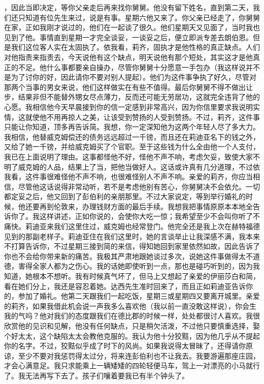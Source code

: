 {，因此当即决定，等你父亲走后再来找你舅舅。他没有留下姓名，直到第二天，我们还只知道有位先生来过，说是有事。星期六他又来了。你父亲已经走了，你舅舅在家，正如我刚才说过的，他们在一起谈了很久。他们星期天又见面了，当时我也见到了他。事情直到星期一才完全谈妥，一谈妥之后，便立即派专差去朗伯恩。但是我们这位客人实在太固执了。依我看，莉齐，固执才是他性格的真正缺点。人们对他指责来指责去，今天说他有这个缺点，明天说他有那个短处，其实这才是他真正的不足。他什么事都要亲自操办，尽管你舅舅十分愿意一手包办（我这样说并不是为了讨你的好，因此请你不要对别人提起）。他们为这件事争执了好久，尽管对那两个当事的男女来说，他们这样做实在有些不值得。最后你舅舅不得不做出让步，结果非但不能替外甥女尽点薄力，反而还可能无劳居功，这就完全违背了他的心愿。我相信他今天早晨接到你的信一定感到非常高兴，因为你信里要求我说明实情，这就使他不用再掠人之美，让该受到赞扬的人受到赞扬。不过，莉齐，这件事只能让你知道，顶多再告诉简。我想，你一定深知他为这两个年轻人尽了多大力。我相信，他替威克姆偿还的债务远远超过一千镑，而且还在莉迪亚名下的钱之外，又给了她一千镑，并给威克姆买了个官职。至于这些钱为什么全由他一个人支付，我已在上面说明了理由。这事都怪他不好，怪他不声不响，考虑欠妥，致使大家不明了威克姆的人品，结果上了当，把他当做好人。这话或许真有几分道理，不过依我看，这件事很难怪他不声不响，也很难怪别人不声不响。亲爱的莉齐，你应当相信，尽管他这话说得非常动听，若不是考虑他别有苦心，你舅舅决不会依允。一切都定妥之后，他又回到了彭伯利的亲朋那里。不过大家说定，等到举行婚礼的时候，他还要再到伦敦来，办理钱财方面的最后手续。我想我把事情原原本本地全告诉你了。我这样讲述，正如你说的，会使你大吃一惊；我希望至少不会叫你听了不痛快。莉迪亚来我们这里住过，威克姆也经常登门。他完全还是我上次在赫特福德见到的那副老样子。莉迪亚住在我们这里时，她的言谈举止让我深感不满，我本来不打算告诉你，不过星期三接到简的来信，得知她回到家里依然如故，因此告诉了你也不会给你带来新的痛苦。我极其严肃地跟她谈过多次，说她这件事做得太不道德，害得全家人都为之伤心。我的话她即使听到一点，那也是碰巧听到的，因为我知道，她根本不想听。我有时候真气坏了，但马上又想起了亲爱的伊丽莎白和简，看在她们分上，我还是容忍着她。达西先生准时回来了，而且正如莉迪亚告诉你的，参加了婚礼。他第二天跟我们一起吃饭，星期三或星期四又要离开城里。亲爱的莉齐，如果我借此机会说一声我多么喜欢他（我以前一直没敢这样说），你会生我的气吗？他对我们的态度跟我们在德比郡的时候一样，处处都很讨人喜欢。我很欣赏他的见识和见解，他没有任何缺点，只是稍欠活泼，不过他只要慎重选择，娶个好太太，这个缺陷太太会教他克服的。我认为他十分狡黠，因为他几乎从不提起你的名字。不过，狡黠似乎成了时下的风尚。如果我说得太冒昧了，还得请你原谅，至少不要对我惩罚得太过分，将来连彭伯利也不让我去。我要游遍那座庄园，才会心满意足。我只求能乘上一辆矮矮的四轮轻便马车，驾上一对漂亮的小马就行了。我无法再写下去了。孩子们嚷着要我已有半个钟头了。
    \par {}
    \par {}
} 
